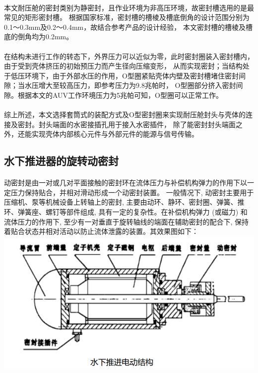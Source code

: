 \documentclass{ctexart}
\begin{document}
\paragraph{}本文耐压舱的密封类别为静密封，且作业环境为非高压环境，故密封槽选用的是最常见的矩形密封槽。
            根据国家标准，密封槽的槽棱及槽底倒角的设计范围分别为0.1～0.3mm及0.2～0.4mm，故结合参考产品的设计经验，
            本文密封槽的槽棱及槽底的倒角均为0.2mm。
\paragraph{}在结构未进行工作的转态下，外界压力可以近似为零，此时密封圈装入密封槽内，由于受到壳体挤压的初始预压力而产生径向压缩变形，
            从而实现密封；当结构处于低压环境下，由于外部水压的作用，O型圈紧贴壳体内壁及密封槽堵住密封间隙；当水压增大至较高压力，即参考压力为9.8兆帕时，
            O型圈部分挤入密封间隙。根据本文的AUV工作环境压力为5兆帕可知，O型圈可以正常工作。
\paragraph{}综上所述，本文选择套筒式的装配方式及O型密封圈来实现耐压舱封头与壳体的连接及密封。封头端面的水密接插孔用于接入水密插件，
            除了能密封封头端面之外，还能实现壳体内部核心元件与外部元件的能源与信号传输。
\subsection{水下推进器的旋转动密封}
\paragraph{}动密封是由一对或几对平面接触的密封环在流体压力与补偿机构弹力的作用下以一定压力保持贴合，并相对滑动形成一个动密封装置。
            一般情况下, 动密封主要用于压缩机、泵等机械设备上转轴上的密封, 主要由动环、静环、密封圈、弹簧、推环、弹簧座、螺钉等部件组成, 具有一定的复杂性。在补偿机构弹力 (或磁力) 和流体压力的作用下,
             至少有一对垂直于旋转轴线的端面在辅助密封的配合下, 保持着贴合状态并相对活动以防止流体泄露的装置。其效果图如下：\\
\includegraphics[scale=0.4]{./mifeng.png}
            
\end{document}
